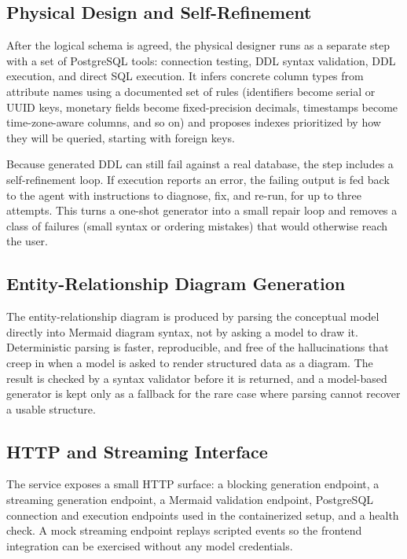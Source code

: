 \subsection{Physical Design and Self-Refinement}

After the logical schema is agreed, the physical designer runs as a separate step with a set of PostgreSQL tools: connection testing, DDL syntax validation, DDL execution, and direct SQL execution. It infers concrete column types from attribute names using a documented set of rules (identifiers become serial or UUID keys, monetary fields become fixed-precision decimals, timestamps become time-zone-aware columns, and so on) and proposes indexes prioritized by how they will be queried, starting with foreign keys.

Because generated DDL can still fail against a real database, the step includes a self-refinement loop. If execution reports an error, the failing output is fed back to the agent with instructions to diagnose, fix, and re-run, for up to three attempts. This turns a one-shot generator into a small repair loop and removes a class of failures (small syntax or ordering mistakes) that would otherwise reach the user.

\subsection{Entity-Relationship Diagram Generation}

The entity-relationship diagram is produced by parsing the conceptual model directly into Mermaid diagram syntax, not by asking a model to draw it. Deterministic parsing is faster, reproducible, and free of the hallucinations that creep in when a model is asked to render structured data as a diagram. The result is checked by a syntax validator before it is returned, and a model-based generator is kept only as a fallback for the rare case where parsing cannot recover a usable structure.

\subsection{HTTP and Streaming Interface}

The service exposes a small HTTP surface: a blocking generation endpoint, a streaming generation endpoint, a Mermaid validation endpoint, PostgreSQL connection and execution endpoints used in the containerized setup, and a health check. A mock streaming endpoint replays scripted events so the frontend integration can be exercised without any model credentials.

